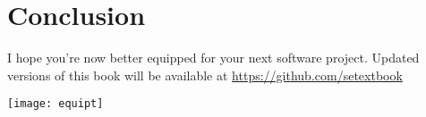\nomargins
\chapter{Conclusion}


I hope you're now better equipped for your next software project. Updated versions of this book will be available at \url{https://github.com/setextbook}\\

\begin{center}
\texttt{[image: equipt]}
\end{center}